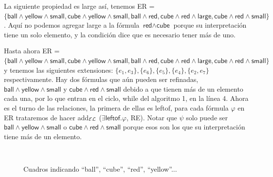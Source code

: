 La siguiente propiedad es \textsf{large} as\'i, tenemos ER = $\{\textsf{ball} \wedge \textsf{yellow} \wedge \textsf{small}, \textsf{cube} \wedge \textsf{yellow} \wedge \textsf{small}, \textsf{ball} \wedge \textsf{red}, \textsf{cube} \wedge \textsf{red} \wedge \textsf{large}, \textsf{cube} \wedge \textsf{red} \wedge \textsf{small}\}$. Aqu\'i no podemos agregar \textsf{large} a la f\'ormula $\textsf{red} \wedge \textsf{cube}$ porque su interpretaci\'on tiene un solo elemento, y la condici\'on dice que es necesario tener m\'as de uno.

Hasta ahora ER = $\{\textsf{ball} \wedge \textsf{yellow} \wedge \textsf{small}, \textsf{cube} \wedge \textsf{yellow} \wedge \textsf{small}, \textsf{ball} \wedge \textsf{red}, \textsf{cube} \wedge \textsf{red} \wedge \textsf{large}, \textsf{cube} \wedge \textsf{red} \wedge \textsf{small}\}$ 
y tenemos las siguientes extensiones: $\{e_1, e_3\}, \{e_6\}, \{e_5\}, \{e_4\}, \{e_2, e_7\}$ respectivamente. 
Hay dos f\'ormulas que a\'un pueden ser refinadas, $\textsf{ball} \wedge \textsf{yellow} \wedge \textsf{small}$ y $\textsf{cube} \wedge \textsf{red} \wedge \textsf{small}$ 
debido a que tienen m\'as de un elemento cada una, por lo que entran en el ciclo, while del algoritmo 1, en la l\'inea 4. Ahora es el turno de las relaciones, la primera de ellas es \textsf{leftof}, para cada f\'ormula $\varphi$ en ER trataremos de hacer add$_\mathcal{EL}$ ($\exists \textsf{leftof}.\varphi$, RE). Notar que $\psi$ solo puede ser $\textsf{ball} \wedge \textsf{yellow} \wedge \textsf{small}$ o $\textsf{cube} \wedge \textsf{red} \wedge \textsf{small}$ porque esos son los que su interpretaci\'on tiene m\'as de un elemento. 
\begin{figure}[ht]
\begin{center}
\\[0pt]
\caption{Cuadros indicando ``ball'', ``cube'', ``red'', ``yellow''...}
\label{fig-modelo15}
\end{center}
\end{figure}


